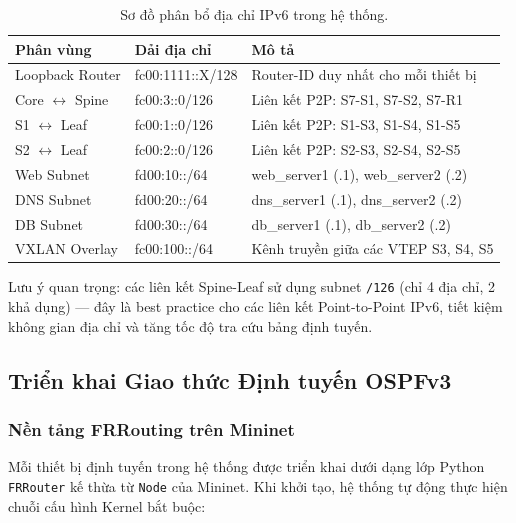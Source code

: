 \begin{table}[H]
    \centering
    \caption{Sơ đồ phân bổ địa chỉ IPv6 trong hệ thống.}
    \label{tab:ipv6_scheme}
    \begin{tabular}{|l|l|p{6cm}|}
        \hline
        \textbf{Phân vùng} & \textbf{Dải địa chỉ} & \textbf{Mô tả} \\
        \hline
        Loopback Router & fc00:1111::X/128 & Router-ID duy nhất cho mỗi thiết bị \\
        \hline
        Core $\leftrightarrow$ Spine & fc00:3::0/126 & Liên kết P2P: S7-S1, S7-S2, S7-R1 \\
        \hline
        S1 $\leftrightarrow$ Leaf & fc00:1::0/126 & Liên kết P2P: S1-S3, S1-S4, S1-S5 \\
        \hline
        S2 $\leftrightarrow$ Leaf & fc00:2::0/126 & Liên kết P2P: S2-S3, S2-S4, S2-S5 \\
        \hline
        Web Subnet & fd00:10::/64 & web\_server1 (.1), web\_server2 (.2) \\
        \hline
        DNS Subnet & fd00:20::/64 & dns\_server1 (.1), dns\_server2 (.2) \\
        \hline
        DB Subnet & fd00:30::/64 & db\_server1 (.1), db\_server2 (.2) \\
        \hline
        VXLAN Overlay & fc00:100::/64 & Kênh truyền giữa các VTEP S3, S4, S5 \\
        \hline
    \end{tabular}
\end{table}

Lưu ý quan trọng: các liên kết Spine-Leaf sử dụng subnet \texttt{/126} (chỉ 4 địa chỉ, 2 khả dụng) — đây là best practice cho các liên kết Point-to-Point IPv6, tiết kiệm không gian địa chỉ và tăng tốc độ tra cứu bảng định tuyến.

\subsection{Triển khai Giao thức Định tuyến OSPFv3}

\subsubsection{Nền tảng FRRouting trên Mininet}

Mỗi thiết bị định tuyến trong hệ thống được triển khai dưới dạng lớp Python \texttt{FRRouter} kế thừa từ \texttt{Node} của Mininet. Khi khởi tạo, hệ thống tự động thực hiện chuỗi cấu hình Kernel bắt buộc:

